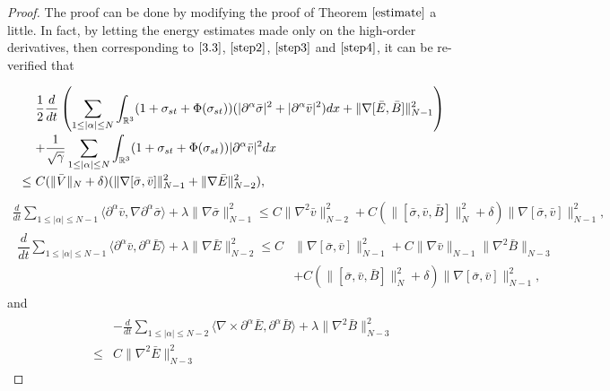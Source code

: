 \documentclass[11pt]{amsart}
\numberwithin{equation}{section}
\begin{document}
\begin{proof}
The proof can be done by modifying the proof of Theorem
$\ref{estimate}$ a little. In fact, by letting the energy estimates
made only on the high-order derivatives, then corresponding to
$\eqref{3.3}$, $\eqref{step2}$, $\eqref{step3}$ and $\eqref{step4}$,
it can be re-verified that

\begin{equation*}
\arraycolsep=1.5pt
\begin{array}{rl}
&\displaystyle \frac{1}{2}\frac{d}{dt}\left(\sum_{1\leq|\alpha|\leq
N}\int_{\mathbb{R}^3}(1+\sigma_{st}+\Phi(\sigma_{st}))
(|\partial^{\alpha}\bar{\sigma}|^2+|\partial^{\alpha}\bar{v}|^2)dx+\|\nabla[\bar{E},\bar{B}]\|_{N-1}^{2}\right)\\[5mm]
&\displaystyle+\frac{1}{\sqrt{\gamma}}\sum_{1\leq|\alpha|\leq
N}\int_{\mathbb{R}^3}(1+\sigma_{st}+\Phi(\sigma_{st}))|\partial^{\alpha}\bar{v}|^{2}dx\\[5mm]
\leq & \displaystyle
C(\|\bar{V}\|_{N}+\delta)(\|\nabla[\bar{\sigma},\bar{v}]\|_{N-1}^{2}
 +\|\nabla \bar{E}\|_{N-2}^2),
 \end{array}
\end{equation*}
\begin{eqnarray*}
 \frac{d}{dt}\sum_{1\leq|\alpha|\leq N-1}\langle
\partial^{\alpha}\bar{v},\nabla\partial^{\alpha}\bar{\sigma}\rangle+\lambda\|\nabla\bar{\sigma}\|^{2}_{N-1}
  \leq  C\|\nabla^2\bar{v}\|_{N-2}^{2}+C(\|[\bar{\sigma}, \bar{v},\bar{B}]\|_{N}^{2}+\delta)
  \|\nabla[\bar{\sigma},\bar{v}]\|_{N-1}^{2},
\end{eqnarray*}
\begin{eqnarray*}
\begin{aligned}
  \dfrac{d}{dt}\sum_{1\leq|\alpha|\leq N-1}\langle
\partial^{\alpha}\bar{v},\partial^{\alpha}\bar{E}\rangle+\lambda\|\nabla\bar{E}\|^{2}_{N-2} \leq
  C&\|\nabla[\bar{\sigma},\bar{v}]\|_{N-1}^{2}+C\|\nabla\bar{v}\|_{N-1}\|\nabla^2
  \bar{B}\|_{N-3}\\
  &+C(\|[\bar{\sigma},\bar{v},\bar{B}]\|_{N}^{2}+\delta)
  \|\nabla[\bar{\sigma},\bar{v}]\|_{N-1}^{2},
  \end{aligned}
\end{eqnarray*}
and
\begin{eqnarray*}
&&\begin{aligned}
  & -\frac{d}{dt}\sum_{1\leq |\alpha|\leq N-2}\langle \nabla
   \times\partial^{\alpha}\bar{E},\partial^{\alpha}\bar{B}\rangle+\lambda\|\nabla^{2}\bar{B}\|^{2}_{N-3}\\
    \leq & C\|\nabla^2\bar{E}\|_{N-3}^{2}

\end{aligned}
\end{eqnarray*}
\end{proof}
\end{document}
